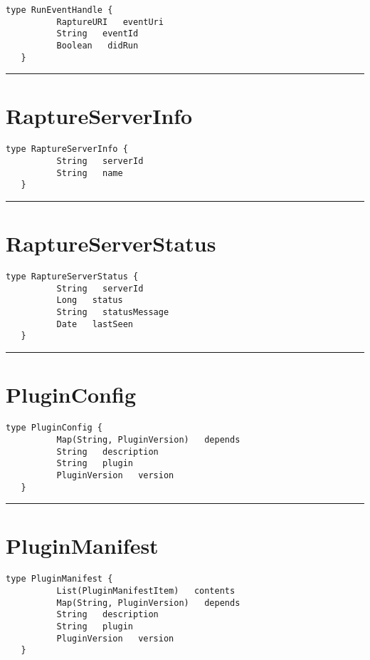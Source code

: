 \begin{lstlisting}[style=nonumbers]
   type RunEventHandle {
          RaptureURI   eventUri
          String   eventId
          Boolean   didRun
   }
\end{lstlisting}

\rule{12cm}{2pt}
\section{RaptureServerInfo}
\label{type:RaptureServerInfo}

\begin{lstlisting}[style=nonumbers]
   type RaptureServerInfo {
          String   serverId
          String   name
   }
\end{lstlisting}

\rule{12cm}{2pt}
\section{RaptureServerStatus}
\label{type:RaptureServerStatus}

\begin{lstlisting}[style=nonumbers]
   type RaptureServerStatus {
          String   serverId
          Long   status
          String   statusMessage
          Date   lastSeen
   }
\end{lstlisting}

\rule{12cm}{2pt}
\section{PluginConfig}
\label{type:PluginConfig}

\begin{lstlisting}[style=nonumbers]
   type PluginConfig {
          Map(String, PluginVersion)   depends
          String   description
          String   plugin
          PluginVersion   version
   }
\end{lstlisting}

\rule{12cm}{2pt}
\section{PluginManifest}
\label{type:PluginManifest}

\begin{lstlisting}[style=nonumbers]
   type PluginManifest {
          List(PluginManifestItem)   contents
          Map(String, PluginVersion)   depends
          String   description
          String   plugin
          PluginVersion   version
   }
\end{lstlisting}

